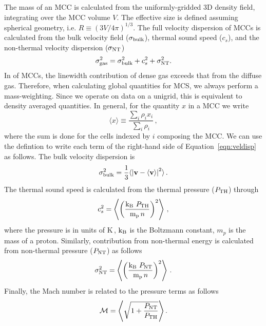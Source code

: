 \IfFileExists{emulateapjlegacy.cls}{\documentclass[iop]{emulateapjlegacy}}{\documentclass[iop]{emulateapj}}
\begin{document}
The mass of an MCC is calculated from the uniformly-gridded 3D density field, integrating over the MCC volume $V$. The effective size is defined assuming spherical geometry, i.e. $R \equiv (3 V /4 \pi)^{1/3}$.
%
The full velocity dispersion of MCCs is calculated from the bulk velocity field ($\sigma_{\rm bulk}$), thermal sound speed ($c_s$), and the non-thermal velocity dispersion ($\sigma_{\rm NT}$)
\begin{equation}
\sigma_{\rm gas}^2 = \sigma_{\rm bulk}^2 + c_s^2 + \sigma_{\rm NT}^2.
\label{eqn:veldisp}
\end{equation}
%
In \obs of MCCs, the linewidth contribution of dense gas exceeds that from the diffuse gas. Therefore, when calculating global quantities for MCS, we always perform a mass-weighting. Since we operate on data on a unigrid, this is equivalent to density averaged quantities. In general, for the quantity $x$ in a MCC we write
\begin{equation}\label{eqn:defineaverage}
\langle x \rangle \equiv \frac{\sum_{i} \rho_i x_i }{\sum_i \rho_i}\,,
\end{equation}
where the sum is done for the cells indexed by $i$ composing the MCC. We can use the defintion  to write each term of the right-hand side of Equation~\ref{eqn:veldisp} as follows.
%
The bulk velocity dispersion is
\begin{equation}
\sigma_{\rm bulk}^2 = \frac{1}{{3}} \langle \left|\mathbf{v} - \langle \mathbf{v} \rangle  \right|^2\rangle \,.
\end{equation}
%
The thermal sound speed is calculated from the thermal pressure ($P_{\rm TH}$) through
\begin{equation}
c_s^2 = \left\langle \left( \frac{{\rm k_B} ~P_{\rm TH}}{{\rm m_p}\, n} \right)^2 \right\rangle\,,
\end{equation}
where the pressure is in units of K\,\cc, $\rm k_B$ is the Boltzmann constant, $m_p$ is the mass of a proton. Similarly, contribution from non-thermal energy is calculated from non-thermal pressure ($P_{\rm NT}$) as follows
\begin{equation}
\sigma_{\rm NT}^2 = \left\langle \left( \frac{{\rm k_B} ~P_{\rm NT}}{{\rm m_p}\, n} \right)^2 \right\rangle\,.
\end{equation}
%
Finally, the Mach number is related to the pressure terms as follows
\begin{equation}
\mathcal{M} = \left\langle \sqrt{ 1 + \frac{P_{\rm NT}}{P_{\rm TH}}} \right\rangle.
\label{eqn:MPress}
\end{equation}
\end{document}
